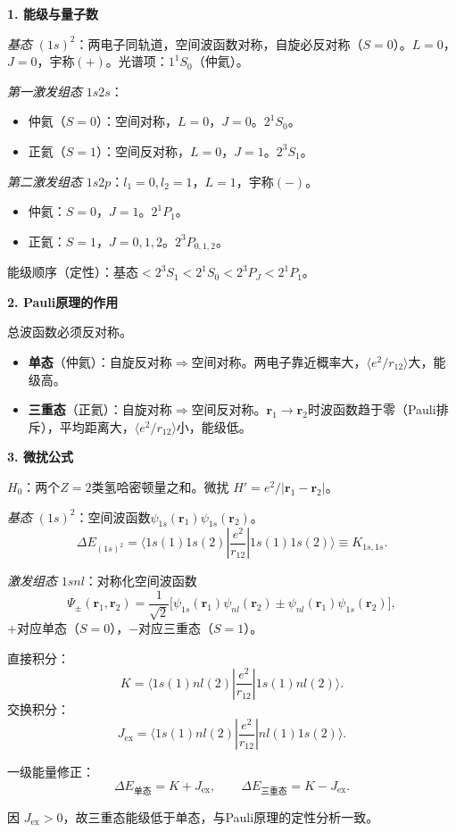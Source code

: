 \begin{derivationbox}[标准解题过程]
\textbf{1. 能级与量子数}

\textit{基态} $(1s)^2$：两电子同轨道，空间波函数对称，自旋必反对称（$S=0$）。$L=0$，$J=0$，宇称$(+)$。光谱项：\textbf{$1^1S_0$}（仲氦）。

\textit{第一激发组态} $1s2s$：
\begin{itemize}
    \item 仲氦（$S=0$）：空间对称，$L=0$，$J=0$。$2^1S_0$。
    \item 正氦（$S=1$）：空间反对称，$L=0$，$J=1$。$2^3S_1$。
\end{itemize}

\textit{第二激发组态} $1s2p$：$l_1=0,l_2=1$，$L=1$，宇称$(-)$。
\begin{itemize}
    \item 仲氦：$S=0$，$J=1$。$2^1P_1$。
    \item 正氦：$S=1$，$J=0,1,2$。$2^3P_{0,1,2}$。
\end{itemize}

能级顺序（定性）：基态$<2^3S_1<2^1S_0<2^3P_J<2^1P_1$。

\textbf{2. Pauli原理的作用}

总波函数必须反对称。
\begin{itemize}
    \item \textbf{单态}（仲氦）：自旋反对称$\Rightarrow$空间对称。两电子靠近概率大，$\langle e^2/r_{12}\rangle$大，能级高。
    \item \textbf{三重态}（正氦）：自旋对称$\Rightarrow$空间反对称。$\mathbf{r}_1\to\mathbf{r}_2$时波函数趋于零（Pauli排斥），平均距离大，$\langle e^2/r_{12}\rangle$小，能级低。
\end{itemize}

\textbf{3. 微扰公式}

$H_0$：两个$Z=2$类氢哈密顿量之和。微扰 $H'=e^2/|\mathbf{r}_1-\mathbf{r}_2|$。

\textit{基态} $(1s)^2$：空间波函数$\psi_{1s}(\mathbf{r}_1)\psi_{1s}(\mathbf{r}_2)$。
\[
\Delta E_{(1s)^2}=\langle1s(1)1s(2)|\frac{e^2}{r_{12}}|1s(1)1s(2)\rangle\equiv K_{1s,1s}.
\]

\textit{激发组态} $1snl$：对称化空间波函数
\[
\Psi_\pm(\mathbf{r}_1,\mathbf{r}_2)=\frac{1}{\sqrt2}\bigl[\psi_{1s}(\mathbf{r}_1)\psi_{nl}(\mathbf{r}_2)\pm\psi_{nl}(\mathbf{r}_1)\psi_{1s}(\mathbf{r}_2)\bigr],
\]
$+$对应单态（$S=0$），$-$对应三重态（$S=1$）。

直接积分：
\[
K=\langle1s(1)nl(2)|\frac{e^2}{r_{12}}|1s(1)nl(2)\rangle.
\]
交换积分：
\[
J_{\text{ex}}=\langle1s(1)nl(2)|\frac{e^2}{r_{12}}|nl(1)1s(2)\rangle.
\]

一级能量修正：
\begin{equation}
\boxed{\Delta E_{\text{单态}}=K+J_{\text{ex}},\qquad \Delta E_{\text{三重态}}=K-J_{\text{ex}}.}
\end{equation}

因 $J_{\text{ex}}>0$，故三重态能级低于单态，与Pauli原理的定性分析一致。
\end{derivationbox}

